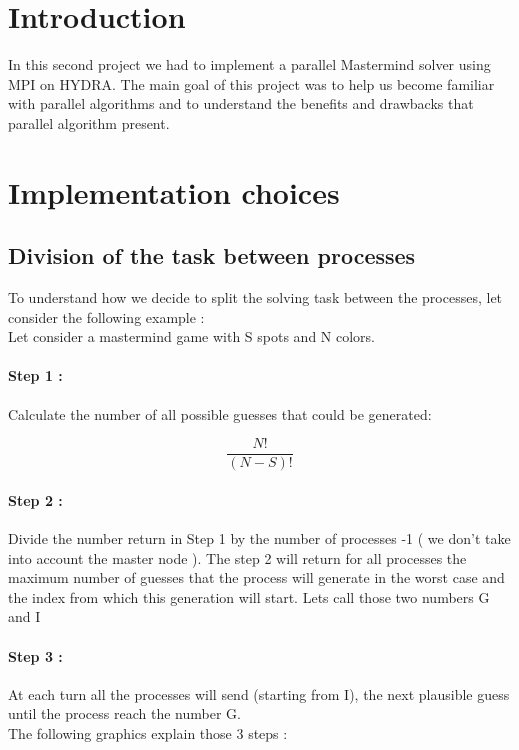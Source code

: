 \section{Introduction}

In this second project we had to implement a parallel Mastermind solver using MPI on HYDRA.
The main goal of this project was to help us become familiar with parallel algorithms and to understand the benefits and drawbacks that parallel algorithm present.

\section{Implementation choices}
\subsection{Division of the task between processes}
To understand how we decide to split the solving task between the processes, let consider the following example : \\
Let consider a mastermind game with S spots and N colors.
\paragraph{Step 1 : } Calculate the number of all possible guesses that could be generated:

\[ \frac{N!}{(N-S)!} \]

\paragraph{Step 2 : } Divide the number return in Step 1 by the number of processes -1 ( we don't take into account the master node ). The step 2 will return for all processes the maximum number of guesses that the process will generate in the worst case and the index from which this generation will start. Lets call those two numbers G and I

\paragraph{Step 3 : } At each turn all the processes will send (starting from I), the next plausible guess until the process reach the number  G.
\\
The following graphics explain those 3 steps :

